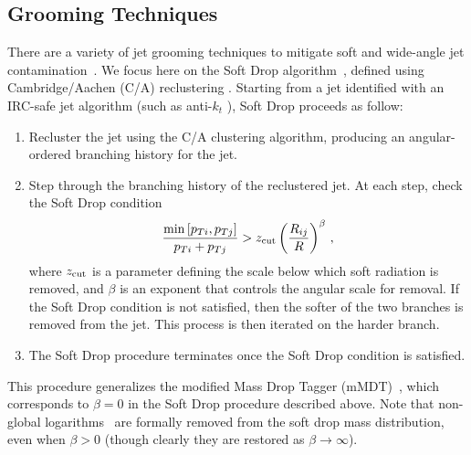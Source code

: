 
\subsection{Grooming Techniques}\label{sec:groom_tech}

There are a variety of jet grooming techniques to mitigate soft and wide-angle jet contamination~\cite{Butterworth:2008iy,Ellis:2009su,Ellis:2009me,Krohn:2009th,Dasgupta:2013ihk,Larkoski:2014wba}.
%
We focus here on the Soft Drop algorithm~\cite{Larkoski:2014wba}, defined using Cambridge/Aachen (C/A) reclustering \cite{Dokshitzer:1997in,Wobisch:1998wt,Wobisch:2000dk}.
%
Starting from a jet identified with an IRC-safe jet algorithm (such as anti-$k_t$ \cite{Cacciari:2008gp}), Soft Drop proceeds as follow:
%
\begin{enumerate}
%
\item Recluster the jet using the C/A clustering algorithm, producing an angular-ordered branching history for the jet.
%
\item Step through the branching history of the reclustered jet.  At each step, check the Soft Drop condition
%
\begin{align}\label{eq:sd_cut}
\frac{\min\left[ p_{Ti}, p_{Tj}  \right]}{p_{Ti}+p_{Tj}}> z_{\rm cut} \left(   \frac{R_{ij}}{R}\right)^\beta \,,
\end{align}
%
where $z_{\rm cut}$ is a parameter defining the scale below which soft radiation is removed, and $\beta$ is an exponent that controls the angular scale for removal.
%
If the Soft Drop condition is not satisfied, then the softer of the two branches is removed from the jet.  This process is then iterated on the harder branch.
%
\item The Soft Drop procedure terminates once the Soft Drop condition is satisfied.
%
\end{enumerate}
%
This procedure generalizes the modified Mass Drop Tagger (mMDT)~\cite{Dasgupta:2013ihk}, which corresponds to $\beta=0$ in the Soft Drop procedure described above.
%
Note that non-global logarithms~\cite{Dasgupta:2001sh} are formally removed from the soft drop mass distribution, even when $\beta>0$ (though clearly they are restored as $\beta\rightarrow\infty$).



